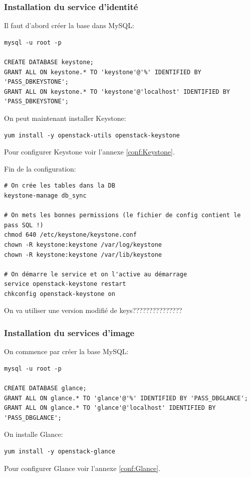 \documentclass[a4paper,oneside]{report}
\begin{document}
\subsubsection{Installation du service d'identité}
Il faut d'abord créer la base dans MySQL:
\begin{verbatim}
mysql -u root -p

CREATE DATABASE keystone;
GRANT ALL ON keystone.* TO 'keystone'@'%' IDENTIFIED BY 'PASS_DBKEYSTONE';
GRANT ALL ON keystone.* TO 'keystone'@'localhost' IDENTIFIED BY 'PASS_DBKEYSTONE';
\end{verbatim}

On peut maintenant installer Keystone:
\begin{verbatim}
yum install -y openstack-utils openstack-keystone
\end{verbatim}

Pour configurer Keystone voir l'annexe \ref{conf:Keystone}.

Fin de la configuration:
\begin{verbatim} 
# On crée les tables dans la DB
keystone-manage db_sync

# On mets les bonnes permissions (le fichier de config contient le pass SQL !)
chmod 640 /etc/keystone/keystone.conf 
chown -R keystone:keystone /var/log/keystone
chown -R keystone:keystone /var/lib/keystone

# On démarre le service et on l'active au démarrage
service openstack-keystone restart
chkconfig openstack-keystone on
\end{verbatim}

On va utiliser une version modifié de keys???????????????


\subsubsection{Installation du services d'image}
\noindent On commence par créer la base MySQL:
\begin{verbatim}
mysql -u root -p

CREATE DATABASE glance;
GRANT ALL ON glance.* TO 'glance'@'%' IDENTIFIED BY 'PASS_DBGLANCE';
GRANT ALL ON glance.* TO 'glance'@'localhost' IDENTIFIED BY 'PASS_DBGLANCE';
\end{verbatim}

\noindent On installe Glance:
\begin{verbatim}
yum install -y openstack-glance
\end{verbatim}

\noindent Pour configurer Glance voir l'annexe \ref{conf:Glance}.
\end{document}
